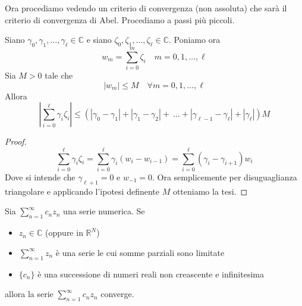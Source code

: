 Ora procediamo vedendo un criterio di convergenza (non assoluta) che sarà il
criterio di convergenza di Abel. Procediamo a passi più piccoli.
\begin{lemmao}
    Siano \(\gamma_0, \gamma_{1}, \dots, \gamma_{\ell} \in \mathbb{C}\) e siano
    \(\zeta_{0}, \zeta_{1}, \dots, \zeta_{\ell} \in \mathbb{C} \). Poniamo ora 
    \[
        w_m = \sum_{i=0}^{m} \zeta_i \quad m = 0, 1, \dots, \ell
    \]
    Sia \(M > 0\) tale che 
    \[
        |w_m| \le M \quad \forall m = 0, 1, \dots, \ell
    \]
    Allora 
    \[
        \left| \sum_{i=0}^{\ell} \gamma_i \zeta_i \right| \le (|\gamma_0 -
        \gamma_{1}| + |\gamma_1 - \gamma_{2}| +~\dots + |\gamma_{\ell-1} -
        \gamma_{\ell}| + |\gamma_{\ell}|)M
    \]
\end{lemmao}
\begin{proof}
    \[
        \sum_{i=0}^{\ell} \gamma_{i} \zeta_{i} = \sum_{i=0}^{\ell} \gamma_{i}
        (w_{i} - w_{i-1}) = \sum_{i=0}^{\ell} (\gamma_{i} - \gamma_{i+1})w_{i}
    \]
    Dove si intende che \(\gamma_{\ell+1} = 0\) e \(w_{-1} = 0\). Ora
    semplicemente per disuguaglianza triangolare e applicando l'ipotesi
    definente \(M\) otteniamo la tesi.
\end{proof}

\begin{theorem}
    Sia \(\sum_{n=1}^{\infty} c_{n} z_{n}\) una serie numerica. Se 
    \begin{itemize}
        \item \(z_{n} \in \mathbb{C}\) (oppure in \(\mathbb{R}^{N}\))
        \item \(\sum_{n=1}^{\infty} z_{n}\) è una serie le cui somme parziali
            sono limitate
        \item \(\{c_{n}\}\) è una successione di numeri reali non creascente e
            infinitesima
    \end{itemize}
    allora la serie \(\sum_{n=1}^{\infty} c_{n} z_{n}\) converge.
\end{theorem}


